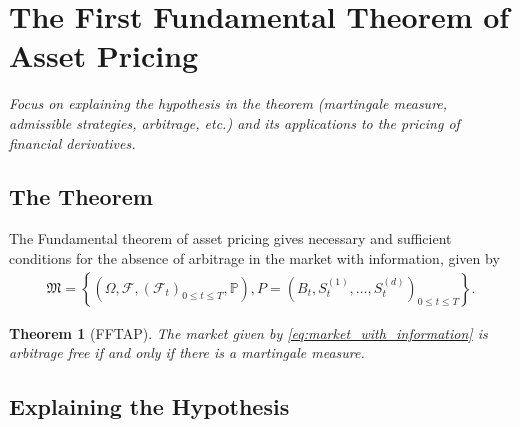 \documentclass{article}
\newtheorem{theorem}{Theorem}[section]
\theoremstyle{definition}
\numberwithin{equation}{section}
\begin{document}
\newpage

\section{The First Fundamental Theorem of Asset Pricing}
\textit{Focus on explaining the hypothesis in the theorem (martingale measure, admissible strategies, arbitrage, etc.) and its applications to the pricing of financial derivatives.}

\subsection{The Theorem}
The Fundamental theorem of asset pricing gives necessary and sufficient conditions for the absence of arbitrage in the market with information, given by
\begin{align}\label{eq:market_with_information}
    \mathfrak{M} =
    \left\{
        \left(
            \Omega, 
            \mathscr{F}, 
            \left(
                \mathscr{F}_t
            \right)_{0 \leq t \leq T},
            \mathbb{P}
        \right),
        P =
        \left(
            B_t,
            S_t^{(1)},
            \ldots,
            S_t^{(d)}
        \right)_{0 \leq t \leq T}
    \right\}.
\end{align}

\begin{theorem}[FFTAP]\label{th:fftap}
    The market given by \eqref{eq:market_with_information} is arbitrage free if and only if there is a martingale measure. 
\end{theorem}

\subsection{Explaining the Hypothesis}
\end{document}

